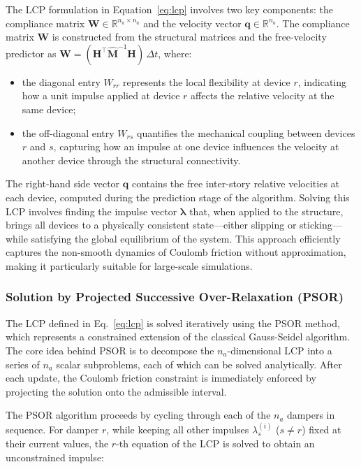 \documentclass[preprint,12pt,authoryear]{elsarticle}
\begin{document}
The LCP formulation in Equation~\eqref{eq:lcp} involves two key components: the compliance matrix $\bm{W} \in \mathbb{R}^{n_a \times n_a}$ and the velocity vector $\bm{q} \in \mathbb{R}^{n_a}$. The compliance matrix $\bm{W}$ is constructed from the structural matrices and the free-velocity predictor as $\bm{W} = (\bm{H}^{\top}\hat{\bm{M}}^{-1}\bm{H})\,\Delta t$, where:

\begin{itemize}
	\renewcommand{\labelitemi}{---}
	\item the diagonal entry $W_{rr}$ represents the local flexibility at device $r$, indicating how a unit impulse applied at device $r$ affects the relative velocity at the same device;
	\item the off-diagonal entry $W_{rs}$ quantifies the mechanical coupling between devices $r$ and $s$, capturing how an impulse at one device influences the velocity at another device through the structural connectivity.
\end{itemize}

The right-hand side vector $\bm{q}$ contains the free inter-story relative velocities at each device, computed during the prediction stage of the algorithm. Solving this LCP involves finding the impulse vector $\bm{\lambda}$ that, when applied to the structure, brings all devices to a physically consistent state---either slipping or sticking---while satisfying the global equilibrium of the system. This approach efficiently captures the non-smooth dynamics of Coulomb friction without approximation, making it particularly suitable for large-scale simulations.

\subsubsection{Solution by Projected Successive Over-Relaxation (PSOR)}
\label{sec:theory:psor}

The LCP defined in Eq.~\ref{eq:lcp} is solved iteratively using the PSOR method, which represents a constrained extension of the classical Gauss-Seidel algorithm. The core idea behind PSOR is to decompose the $n_a$-dimensional LCP into a series of $n_a$ scalar subproblems, each of which can be solved analytically. After each update, the Coulomb friction constraint is immediately enforced by projecting the solution onto the admissible interval.

The PSOR algorithm proceeds by cycling through each of the $n_a$ dampers in sequence. For damper $r$, while keeping all other impulses $\lambda_s^{(i)}$ ($s \neq r$) fixed at their current values, the $r$-th equation of the LCP is solved to obtain an unconstrained impulse:
\end{document}
